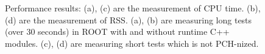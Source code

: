 \documentclass{webofc}
\begin{document}
\begin{figure}
\begin{minipage}{.48\textwidth}
 　 \end{minipage}\hfill
    \begin{minipage}{.48\textwidth}
 　 \end{minipage}
\caption{Performance results: (a), (c) are the measurement of CPU time. (b), (d) are the measurement of RSS. (a), (b) are measuring long tests (over 30 seconds) in ROOT with and without runtime C++ modules. (c), (d) are measuring short tests which is not PCH-nized.}
\label{fig:performance1}
\end{figure}
\end{document}
